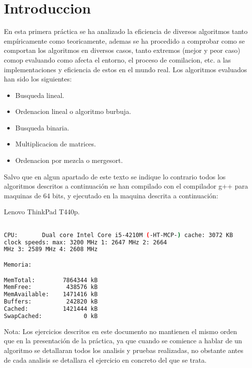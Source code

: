 \section{Introduccion}

En esta primera práctica se ha analizado la eficiencia de diversos algoritmos tanto empíricamente como teoricamente, ademas se ha procedido a comprobar como se comportan los algoritmos en diversos casos, tanto extremos (mejor y peor caso) comop evaluando como afecta el entorno, el proceso de comilacion, etc. a las implementaciones y eficiencia de estos en el mundo real. Los algoritmos evaluados han sido los siguientes:

\begin{itemize}
\item Busqueda lineal.
\item Ordenacion lineal o algoritmo burbuja.
\item Busqueda binaria.
\item Multiplicacion de matrices.
\item Ordenacion por mezcla o mergesort.
\end{itemize}

Salvo que en algun apartado de este texto se indique lo contrario todos los algoritmos descritos a continuación se han compilado con el compilador g++ para maquinas de 64 bits, y ejecutado en la maquina descrita a continuación:

Lenovo ThinkPad T440p.

\begin{lstlisting}[language=bash]

CPU:       Dual core Intel Core i5-4210M (-HT-MCP-) cache: 3072 KB 
clock speeds: max: 3200 MHz 1: 2647 MHz 2: 2664
MHz 3: 2589 MHz 4: 2608 MHz

Memoria:

MemTotal:        7864344 kB
MemFree:          438576 kB
MemAvailable:    1471416 kB
Buffers:          242820 kB
Cached:          1421444 kB
SwapCached:            0 kB

\end{lstlisting}

Nota: Los ejercicios descritos en este documento no mantienen el mismo orden que en la presentación de la práctica, ya que cuando se comience a hablar de un algoritmo se detallaran todos los analisis y pruebas realizadas, no obstante antes de cada analisis se detallara el ejercicio en concreto del que se trata.